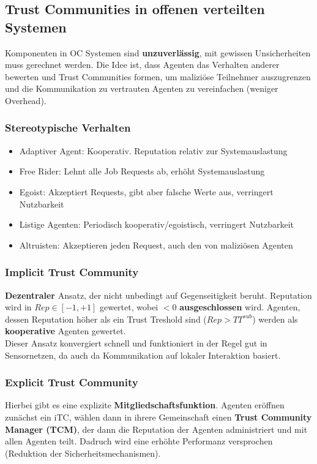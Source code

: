 \documentclass[a4paper]{article}
\begin{document}
\subsection{Trust Communities in offenen verteilten Systemen}
Komponenten in OC Systemen sind \textbf{unzuverlässig}, mit gewissen Unsicherheiten muss gerechnet werden. Die Idee ist, dass Agenten das Verhalten anderer bewerten und Trust Communities formen, um maliziöse Teilnehmer auszugrenzen und die Kommunikation zu vertrauten Agenten zu vereinfachen (weniger Overhead).
\subsubsection{Stereotypische Verhalten}
\begin{itemize}
	\item Adaptiver Agent: Kooperativ. Reputation relativ zur Systemauslastung
	\item Free Rider: Lehnt alle Job Requests ab, erhöht Systemauslastung
	\item Egoist: Akzeptiert Requests, gibt aber falsche Werte aus, verringert Nutzbarkeit
	\item Listige Agenten: Periodisch kooperativ/egoistisch, verringert Nutzbarkeit
	\item Altruisten: Akzeptieren jeden Request, auch den von maliziösen Agenten
\end{itemize}
\subsubsection{Implicit Trust Community}
\textbf{Dezentraler} Ansatz, der nicht unbedingt auf Gegenseitigkeit beruht. Reputation wird in $Rep\in[-1,+1]$ gewertet, wobei $<0$ \textbf{ausgeschlossen} wird. Agenten, dessen Reputation höher als ein Trust Treshold sind ($Rep>TT^{sub}$) werden als \textbf{kooperative} Agenten gewertet.\\

Dieser Ansatz konvergiert schnell und funktioniert in der Regel gut in Sensornetzen, da auch da Kommunikation auf lokaler Interaktion basiert.

\subsubsection{Explicit Trust Community}
Hierbei gibt es eine explizite \textbf{Mitgliedschaftsfunktion}. Agenten eröffnen zunächst ein iTC, wählen dann in ihrere Gemeinschaft einen \textbf{Trust Community Manager (TCM)}, der dann die Reputation der Agenten administriert und mit allen Agenten teilt. Dadruch wird eine erhöhte Performanz versprochen (Reduktion der Sicherheitsmechanismen).\\
\end{document}
